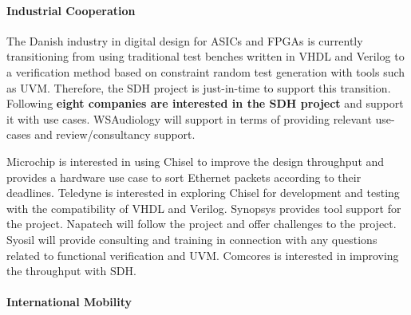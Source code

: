 \documentclass[fleqn,12pt]{article}
\newcommand{\todo}[1]{{\color{red} TODO: #1}}
\begin{document}
%



\paragraph*{Industrial Cooperation}

The Danish industry in digital design for ASICs and FPGAs is currently transitioning from using traditional
test benches written in VHDL and Verilog to a verification method based on constraint random
test generation with tools such as UVM. Therefore, the SDH project is just-in-time to support this
transition.
%
Following {\bf eight companies are interested in the SDH project} and support it with use cases.
WSAudiology will support in terms of providing relevant use-cases and review/consultancy support.



Microchip is interested in using Chisel to improve the design throughput and
provides a hardware use case to sort Ethernet packets according to their deadlines.
Teledyne is interested in exploring Chisel for development and testing with the compatibility of VHDL and Verilog.
Synopsys provides tool support for the project.
Napatech will follow the project and offer challenges to the project.
Syosil will provide consulting and training in connection with any questions related to functional verification and UVM.
Comcores is interested in improving the throughput with SDH.


%

\paragraph{International Mobility}
\end{document}

